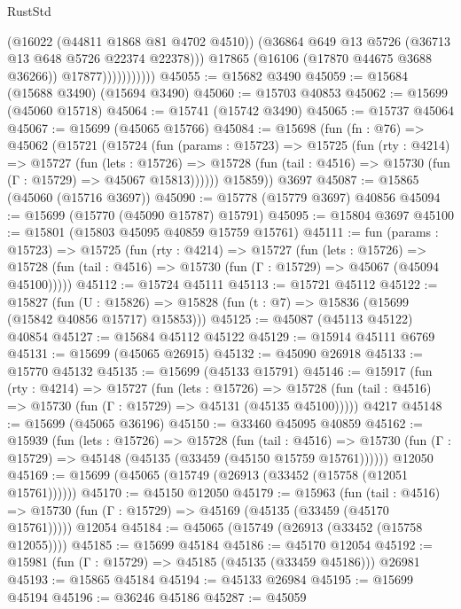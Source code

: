 \begin{lexlean}{RustStd}
\begin{coremodule}
                            (@16022 (@44811 @1868 @81 @4702 @4510))
                            (@36864 @649 @13 @5726 (@36713 @13 @648 @5726 @22374 @22378)))
                          @17865
                          (@16106 (@17870 @44675 @3688 @36266))
                          @17877)))))))))))
@45055 := @15682 @3490
@45059 := @15684 (@15688 @3490) (@15694 @3490)
@45060 := @15703 @40853
@45062 := @15699 (@45060 @15718)
@45064 := @15741 (@15742 @3490)
@45065 := @15737 @45064
@45067 := @15699 (@45065 @15766)
@45084 := @15698
    (fun (fn : @76) =>
    @45062
      (@15721
        (@15724
          (fun (params : @15723) =>
          @15725
            (fun (rty : @4214) =>
            @15727
              (fun (lets : @15726) =>
              @15728 (fun (tail : @4516) => @15730 (fun (Γ : @15729) => @45067 @15813))))))
        @15859))
    @3697
@45087 := @15865 (@45060 (@15716 @3697))
@45090 := @15778 (@15779 @3697) @40856
@45094 := @15699 (@15770 (@45090 @15787) @15791)
@45095 := @15804 @3697
@45100 := @15801 (@15803 @45095 @40859 @15759 @15761)
@45111 := fun (params : @15723) =>
  @15725
    (fun (rty : @4214) =>
    @15727
      (fun (lets : @15726) =>
      @15728 (fun (tail : @4516) => @15730 (fun (Γ : @15729) => @45067 (@45094 @45100)))))
@45112 := @15724 @45111
@45113 := @15721 @45112
@45122 := @15827
    (fun (U : @15826) => @15828 (fun (t : @7) => @15836 (@15699 (@15842 @40856 @15717) @15853)))
@45125 := @45087 (@45113 @45122) @40854
@45127 := @15684 @45112 @45122
@45129 := @15914 @45111 @6769
@45131 := @15699 (@45065 @26915)
@45132 := @45090 @26918
@45133 := @15770 @45132
@45135 := @15699 (@45133 @15791)
@45146 := @15917
    (fun (rty : @4214) =>
    @15727
      (fun (lets : @15726) =>
      @15728 (fun (tail : @4516) => @15730 (fun (Γ : @15729) => @45131 (@45135 @45100)))))
    @4217
@45148 := @15699 (@45065 @36196)
@45150 := @33460 @45095 @40859
@45162 := @15939
    (fun (lets : @15726) =>
    @15728
      (fun (tail : @4516) =>
      @15730 (fun (Γ : @15729) => @45148 (@45135 (@33459 (@45150 @15759 @15761))))))
    @12050
@45169 := @15699 (@45065 (@15749 (@26913 (@33452 (@15758 (@12051 @15761))))))
@45170 := @45150 @12050
@45179 := @15963
    (fun (tail : @4516) => @15730 (fun (Γ : @15729) => @45169 (@45135 (@33459 (@45170 @15761)))))
    @12054
@45184 := @45065 (@15749 (@26913 (@33452 (@15758 @12055))))
@45185 := @15699 @45184
@45186 := @45170 @12054
@45192 := @15981 (fun (Γ : @15729) => @45185 (@45135 (@33459 @45186))) @26981
@45193 := @15865 @45184
@45194 := @45133 @26984
@45195 := @15699 @45194
@45196 := @36246 @45186
@45287 := @45059

\end{coremodule}
\end{lexlean}
